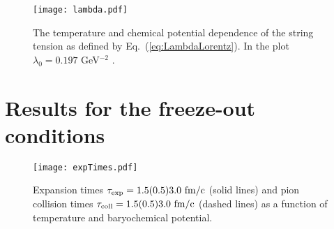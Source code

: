 \documentclass[12pt]{article}
\begin{document}

\begin{figure}[h]
	\begin{center}
	\texttt{[image: lambda.pdf]}
	\caption{The temperature and chemical potential dependence of the string tension as defined 
	by Eq.~(\ref{eq:LambdaLorentz}). In the plot $\lambda_0=0.197$ GeV$^{-2}$ \cite{Hufner:1992cu}.}
	\label{fig:lambda}
	\end{center}
\end{figure}





\section{Results for the freeze-out conditions}
\label{results}



\begin{figure}[h]
	\begin{center}
	\texttt{[image: expTimes.pdf]}
	\caption{Expansion times $\tau_{\rm exp}=1.5(0.5)3.0~{\rm fm/c}$ (solid lines) and pion collision times
	 $\tau_{\rm coll}=1.5(0.5)3.0 ~{\rm fm/c}$  (dashed lines) 
	 as a function of temperature and baryochemical potential.}
	\label{fig:TimeScalesDiagram}
	\end{center}
\end{figure}

\end{document}
